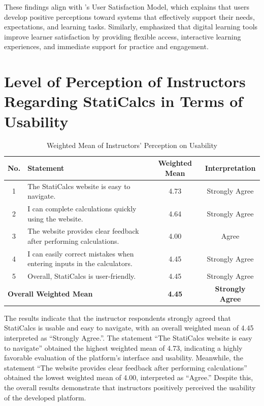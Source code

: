 These findings align with \cite{johnson_customer_2001}'s User Satisfaction Model, which explains that users develop positive perceptions toward systems that effectively support their needs, expectations, and learning tasks. Similarly, \cite{pedraza_assessing_2025} emphasized that digital learning tools improve learner satisfaction by providing flexible access, interactive learning experiences, and immediate support for practice and engagement.


\section{Level of Perception of Instructors Regarding StatiCalcs in Terms of Usability}

\begin{table}[H]

\centering
\caption{Weighted Mean of Instructors’ Perception on Usability}
\renewcommand{\arraystretch}{1.3}
\begin{tabular}{cp{6cm}cc}
\hline
\textbf{No.} & \textbf{Statement} & \textbf{Weighted Mean} & \textbf{Interpretation}\\
\hline
1 & The StatiCalcs website is easy to navigate. & 4.73 & Strongly Agree\\
2 & I can complete calculations quickly using the website. & 4.64 & Strongly Agree\\
3 & The website provides clear feedback after performing calculations. & 4.00 & Agree\\
4 & I can easily correct mistakes when entering inputs in the calculators. & 4.45 & Strongly Agree\\
5 & Overall, StatiCalcs is user-friendly. & 4.45 & Strongly Agree\\
\multicolumn{2}{l}{\textbf{Overall Weighted Mean}} & \textbf{4.45} & \textbf{Strongly Agree}\\
\hline
\end{tabular}
\end{table}


The results indicate that the instructor respondents strongly agreed that StatiCalcs is usable and easy to navigate, with an overall weighted mean of 4.45 interpreted as ``Strongly Agree.''. The statement ``The StatiCalcs website is easy to navigate'' obtained the highest weighted mean of 4.73, indicating a highly favorable evaluation of the platform’s interface and usability. Meanwhile, the statement ``The website provides clear feedback after performing calculations'' obtained the lowest weighted mean of 4.00, interpreted as ``Agree.'' Despite this, the overall results demonstrate that instructors positively perceived the usability of the developed platform.

